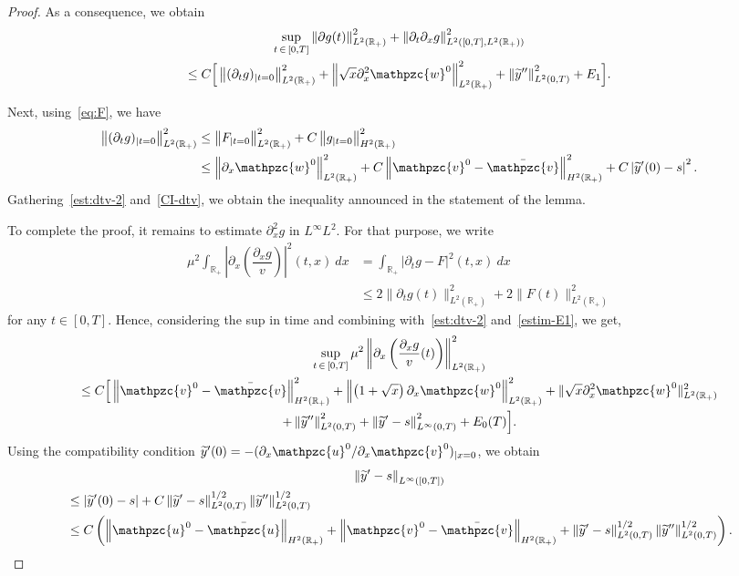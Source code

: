 \documentclass[AHL,Unicode,longabstracts,published]{cedram}
\newcommand{\R}{\mathbb{R}}
\newcommand{\p}{\partial}
\newcommand{\bv}{\bar{\mathpzc{v}}}
\newcommand{\bu}{\bar{\mathpzc{u}}}
\newcommand{\tv}{\mathpzc{v}}
\newcommand{\tu}{\mathpzc{u}}
\newcommand{\tw}{\mathpzc{w}}
\newcommand{\ty}{\widetilde{y}}
\begin{document}
\begin{proof}
As a consequence, we obtain
\begin{multline}\label{est:dtv-2}
\sup_{t\, \in\,[0,T]} \left\|\partial g(t)\right\|_{L^2(\R_+)}^2 + \left\|\partial_t \partial_xg\right\|_{L^2\left([0,T],L^2(\R_+)\right)}^2 
\\
\leq C\Big[\left\|(\partial_tg)_{|t=0}\right\|_{L^2(\R_+)}^2 +\left\| \sqrt{x}\partial^2_x \tw^0\right\|_{L^2(\R_+)}^2 + \left\|\ty''\right\|_{L^2(0,T)}^2 + E_1\Big].
\end{multline}

Next, using~\eqref{eq:F}, we have
\begin{equation}\label{CI-dtv}
\begin{split}
\left\|(\partial_tg)_{|t=0}\right\|_{L^2(\R_+)}^2 & \leq \left\|F_{|t=0}\right\|_{L^2(\R_+)}^2 + C\left\|g_{|t=0}\right\|_{H^2(\R_+)}^2 \\
&\leq \left\|\p_x \tw^0\right\|_{L^2(\R_+)}^2 + C \left\|\tv^0 - \bv\right\|_{H^2(\R_+)}^2 + C \left|\ty'(0) -s\right|^2.
\end{split}
\end{equation}
Gathering~\eqref{est:dtv-2} and~\eqref{CI-dtv}, we obtain the inequality announced in the statement of the lemma.


To complete the proof, it remains to estimate $\partial^2_x g$ in $L^\infty L^2$. For that purpose, we write
\begin{align*}
\mu^2 \int_{\R_+} \left|\partial_x\left(\dfrac{\partial_xg}{v} \right)\right|^2(t,x)\:dx & = \int_{\R_+} |\partial_t g - F|^2(t,x)\:dx \\
& \leq 2 \|\partial_tg(t)\|_{L^2(\R_+)}^2 + 2 \|F(t)\|_{L^2(\R_+)}^2
\end{align*}
for any $t \in [0,T]$. Hence, considering the sup in time and combining with~\eqref{est:dtv-2} and~\eqref{estim-E1}, we get,
\begin{multline*}
\sup_{t\, \in\,[0,T]} \mu^2 \left\|\partial_x\left(\dfrac{\partial_xg }{v}(t) \right)\right\|_{L^2(\R_+)}^2 \\
\leq C\Big[\left\|\tv^0 - \bv\right\|_{H^2(\R_+)}^2 + \left\|\left(1+\sqrt{x}\right) \partial_x \tw^0\right\|_{L^2(\R_+) }^2 + \|\sqrt{x} \partial^2_x \tw^0\|_{L^2(\R_+)}^2 \\
+ \left\|\ty''\right\|_{L^2(0,T)}^2+ \left\|\ty'-s\right\|_{L^\infty(0,T)}^2 + E_0 (T) \Big].
\end{multline*}
Using the compatibility condition $\ty'(0)=-(\p_x \tu^0/\p_x \tv^0)_{|x=0}$, we obtain
\begin{multline}\label{est:b-infty}
\left\|\ty'-s\right\|_{L^\infty([0,T])}\\
\begin{aligned}
&\leq \left|\ty'(0)-s\right| + C\left\|\ty'-s\right\|_{L^2(0,T)}^{1/2} \left\|\ty''\right\|_{L^2(0,T)}^{1/2}\\
&\leq C\left(\left\|\tu^0-\bu\right\|_{H^2(\R_+)} +\left\|\tv^0-\bv\right\|_{H^2(\R_+)}+ \left\|\ty'-s\right\|_{L^2(0,T)}^{1/2} \left\|\ty''\right\|_{L^2(0,T)}^{1/2}\right).
\end{aligned}
\end{multline}


\end{proof}
\end{document}
